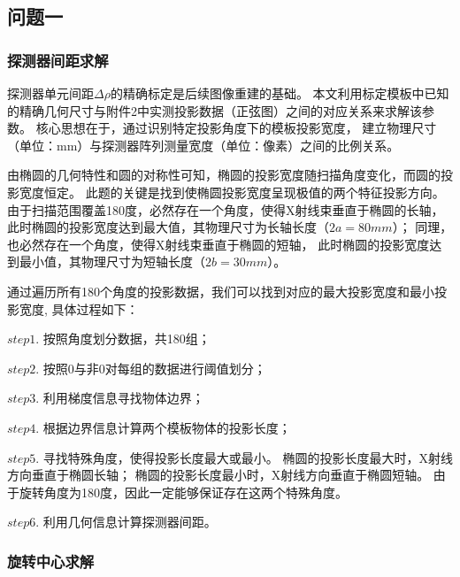 \subsection{问题一}
\subsubsection{探测器间距求解}

探测器单元间距$\Delta\rho$的精确标定是后续图像重建的基础。
本文利用标定模板中已知的精确几何尺寸与附件2中实测投影数据（正弦图）之间的对应关系来求解该参数。
核心思想在于，通过识别特定投影角度下的模板投影宽度，
建立物理尺寸（单位：mm）与探测器阵列测量宽度（单位：像素）之间的比例关系。\par


由椭圆的几何特性和圆的对称性可知，椭圆的投影宽度随扫描角度变化，而圆的投影宽度恒定。
此题的关键是找到使椭圆投影宽度呈现极值的两个特征投影方向。
由于扫描范围覆盖180度，必然存在一个角度，使得X射线束垂直于椭圆的长轴，
此时椭圆的投影宽度达到最大值，其物理尺寸为长轴长度（$2a=80mm$）；
同理，也必然存在一个角度，使得X射线束垂直于椭圆的短轴，
此时椭圆的投影宽度达到最小值，其物理尺寸为短轴长度（$2b=30mm$）。\par

通过遍历所有180个角度的投影数据，我们可以找到对应的最大投影宽度和最小投影宽度,
具体过程如下：\par
$step1.$ 按照角度划分数据，共180组；\par
$step2.$ 按照0与非0对每组的数据进行阈值划分；\par
$step3.$ 利用梯度信息寻找物体边界；\par
$step4.$ 根据边界信息计算两个模板物体的投影长度；\par
$step5.$ 寻找特殊角度，使得投影长度最大或最小。
椭圆的投影长度最大时，X射线方向垂直于椭圆长轴；
椭圆的投影长度最小时，X射线方向垂直于椭圆短轴。
由于旋转角度为180度，因此一定能够保证存在这两个特殊角度。\par
$step6.$ 利用几何信息计算探测器间距。


\subsubsection{旋转中心求解}

